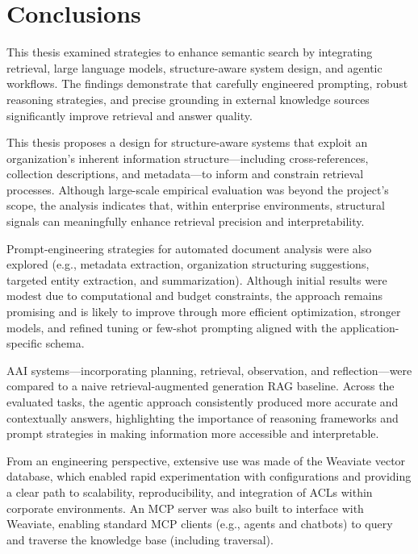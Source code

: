 \cleardoublepage%
\label{chap:conclusion}%


\section{Conclusions}

This thesis examined strategies to enhance semantic search by integrating retrieval, large language models, structure-aware system design, and agentic workflows. The findings demonstrate that carefully engineered prompting, robust reasoning strategies, and precise grounding in external knowledge sources significantly improve retrieval and answer quality.

This thesis proposes a design for structure-aware systems that exploit an organization's inherent information structure—including cross-references, collection descriptions, and metadata—to inform and constrain retrieval processes. Although large-scale empirical evaluation was beyond the project's scope, the analysis indicates that, within enterprise environments, structural signals can meaningfully enhance retrieval precision and interpretability.

Prompt-engineering strategies for automated document analysis were also explored (e.g., metadata extraction, organization structuring suggestions, targeted entity extraction, and summarization). Although initial results were modest due to computational and budget constraints, the approach remains promising and is likely to improve through more efficient optimization, stronger models, and refined tuning or few-shot prompting aligned with the application-specific schema.

\gls{AAI} systems—incorporating planning, retrieval, observation, and reflection—were compared to a naive retrieval-augmented generation \gls{RAG} baseline. Across the evaluated tasks, the agentic approach consistently produced more accurate and contextually answers, highlighting the importance of reasoning frameworks and prompt strategies in making information more accessible and interpretable.

From an engineering perspective, extensive use was made of the Weaviate vector database, which enabled rapid experimentation with configurations and providing a clear path to scalability, reproducibility, and integration of \glspl{ACL} within corporate environments. An \gls{MCP} server was also built to interface with Weaviate, enabling standard \gls{MCP} clients (e.g., agents and chatbots) to query and traverse the knowledge base (including traversal).

